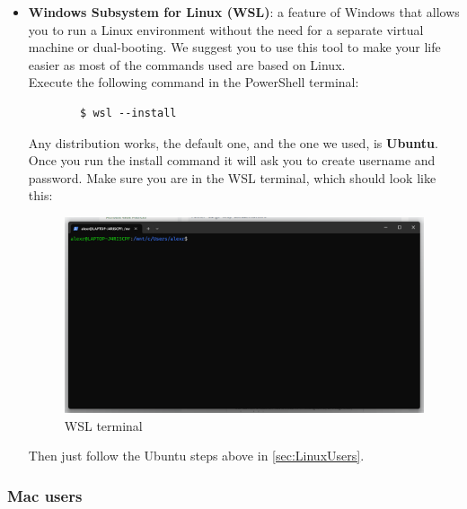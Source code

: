 \begin{itemize}

\item \textbf{Windows Subsystem for Linux (WSL)}: a feature of Windows that allows you to run a Linux environment without the need for a separate virtual machine or dual-booting. We suggest you to use this tool to make your life easier as most of the commands used are based on Linux.
    \\Execute the following command in the PowerShell terminal:
    \begin{verbatim}
        $ wsl --install
    \end{verbatim}
   Any distribution works, the default one, and the one we used, is \textbf{Ubuntu}.
   Once you run the install command it will ask you to create username and password. Make sure you are in the WSL terminal, which should look like this:

    \begin{figure}[H]   %
        \centering
        \includegraphics[scale=0.3]{Images/terminal.png}
        \caption{WSL terminal}
        \label{fig:enter-label}
    \end{figure}

    Then just follow the Ubuntu steps above in \ref{sec:LinuxUsers}.

\end{itemize}


\subsubsection{ Mac users} 



